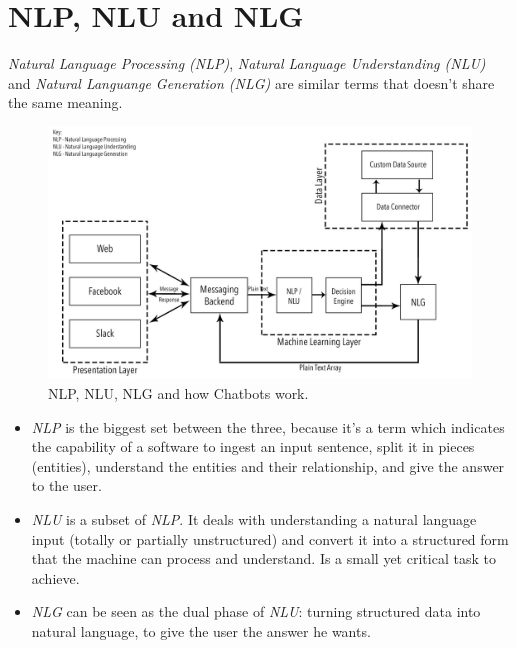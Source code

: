 \documentclass[a4paper,12pt]{report}
\begin{document}
	\section{NLP, NLU and NLG}
	\textit{Natural Language Processing (NLP)}, \textit{Natural Language Understanding (NLU)} and \textit{Natural Languange Generation (NLG)} are similar terms that doesn't share the same meaning. 
	\begin{figure}[H]
		\centering
		\includegraphics[scale=0.2]{nlschema}
		\caption{NLP, NLU, NLG and how Chatbots work.\cite{nlpnlunlg}}
	\end{figure}
	\begin{itemize}
	\item \textit{NLP} is the biggest set between the three, because it's a term which indicates the capability of a software to ingest an input sentence, split it in pieces (entities), understand the entities and their relationship, and give the answer to the user.
	
	\item \textit{NLU} is a subset of \textit{NLP}. It deals with understanding a natural language input (totally or partially unstructured) and convert it into a structured form that the machine can process and understand. Is a small yet critical task to achieve.
	
	\item \textit{NLG} can be seen as the dual phase of \textit{NLU}: turning structured data into natural language, to give the user the answer he wants.
	\end{itemize}
	
\end{document}
